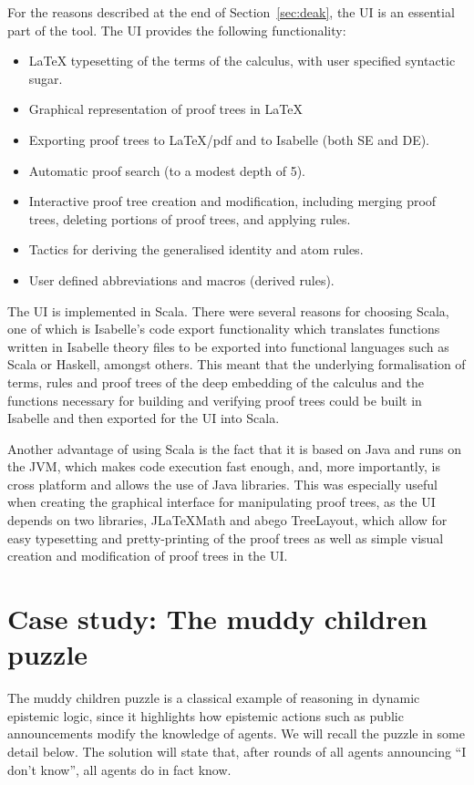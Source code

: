 \documentclass[runningheads,a4paper]{llncs}
\begin{document}
For the reasons described at the end of Section~\ref{sec:deak}, the UI is an essential part of the tool. The UI provides the following functionality:
\begin{itemize}
\item
    LaTeX typesetting of the terms of the calculus, with user specified syntactic sugar.
\item
    Graphical representation of proof trees in LaTeX
\item
    Exporting proof trees to LaTeX/pdf and to Isabelle (both SE and DE).
\item
    Automatic proof search (to a modest depth of 5).
\item
    Interactive proof tree creation and modification, including merging proof trees, deleting portions of proof trees, and applying rules. 
\item Tactics for deriving the generalised identity and atom rules.
\item User defined abbreviations and macros (derived rules). 
\end{itemize}
\noindent
The UI is implemented in Scala. There were several reasons for choosing Scala, one of which is Isabelle's code export functionality which translates functions written in Isabelle theory files to be exported into functional languages such as Scala or Haskell, amongst others. This meant that the underlying formalisation of terms, rules and proof trees of the deep embedding of the calculus and the functions necessary for building and verifying proof trees could be built in Isabelle and then exported for the UI into Scala.

Another advantage of using Scala is the fact that it is based on Java and runs on the JVM, which makes code execution fast enough, and, more importantly,  is cross platform and allows the use of Java libraries. This was especially useful when creating the graphical interface for manipulating proof trees, as the UI depends on two libraries, JLaTeXMath
and abego TreeLayout, which allow for easy typesetting and pretty-printing of the proof trees as well as simple visual creation and modification of proof trees in the UI.

\section{Case study: The muddy children puzzle}\label{sec:mc}

The muddy children puzzle is a classical example of reasoning in dynamic epistemic logic, since it highlights how epistemic actions such as public announcements modify the knowledge of agents. We will recall the puzzle  in some detail below. The solution will state that, after  rounds of all agents announcing ``I don't know'', all agents do in fact know.
\end{document}
